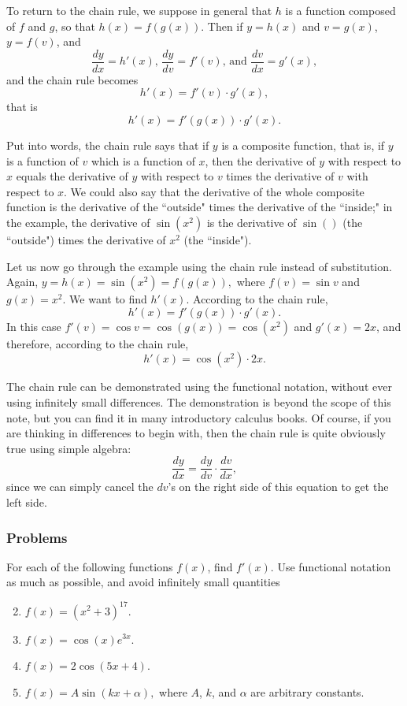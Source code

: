 \documentclass[polutonikogreek,english,twoside,openright]{article}
\begin{document}
To return to the chain rule, we suppose in general that $h$ is a function composed of $f$ and $g$, so that $h(x) = f(g(x))$.  Then if $y= h(x)$ and $v= g(x)$, $y = f(v)$, and 
$$\frac{dy}{dx} = h'(x)\mbox{, } \frac{dy}{dv} = f'(v)\mbox{, and } \frac{dv}{dx} = g'(x),$$
and the chain rule becomes
$$h'(x) = f'(v)\cdot g'(x),$$
that is
$$h'(x) = f'(g(x))\cdot g'(x).$$

Put into words, the chain rule says that if $y$ is a composite
function, that is, if $y$ is a function of $v$ which is a function of
$x$, then the derivative of $y$ with respect to $x$ equals the
derivative of $y$ with respect to $v$ times the derivative of $v$ with
respect to $x$.  We could also say that the derivative of the whole
composite function is the derivative of the ``outside" times the
derivative of the ``inside;" in the example, the derivative of
$\sin(x^2)$ is the derivative of $\sin()$ (the ``outside") times the
derivative of $x^2$ (the ``inside").

Let us now go through the example using the chain rule instead of
substitution. Again, $y = h(x) = \sin (x^2) = f(g(x)),$ where $f(v) = \sin v$ and $g(x) = x^2$. We want to find $h'(x).$   According to the chain rule,
$$h'(x) = f'(g(x))\cdot g'(x).$$
In this case $f'(v) = \cos v = \cos (g(x)) = \cos (x^2)$ and $g'(x) = 2x$, and 
therefore, according to the chain rule,
$$h'(x) = \cos (x^2) \cdot 2x.$$

The chain rule can be demonstrated using the functional notation,
without ever using infinitely small differences.  The demonstration is
beyond the scope of this note, but you can find it in many introductory
calculus books.  Of course, if you are thinking in differences to
begin with, then the chain rule is quite obviously true using simple
algebra:
$$\frac{dy}{dx} = \frac{dy}{dv}\cdot \frac{dv}{dx},$$
since we can simply cancel the $dv$'s on the right side of this
equation to get the left side.

\subsubsection*{Problems}
For each of the following functions $f(x)$, find $f'(x)$.  Use
functional notation as much as possible, and avoid infinitely small
quantities
\begin{enumerate}
  \setcounter{enumi}{1}
\item $f(x) = (x^2 + 3)^{17}.$
\item $f(x) = \cos(x)e^{3x}.$
\item $f(x) = 2\cos(5x + 4).$
\item $f(x) = A\sin(kx + \alpha),$ where $A$, $k$, and $\alpha$ are
  arbitrary constants.
\end{enumerate}\label{chainruleend}
\end{document}
